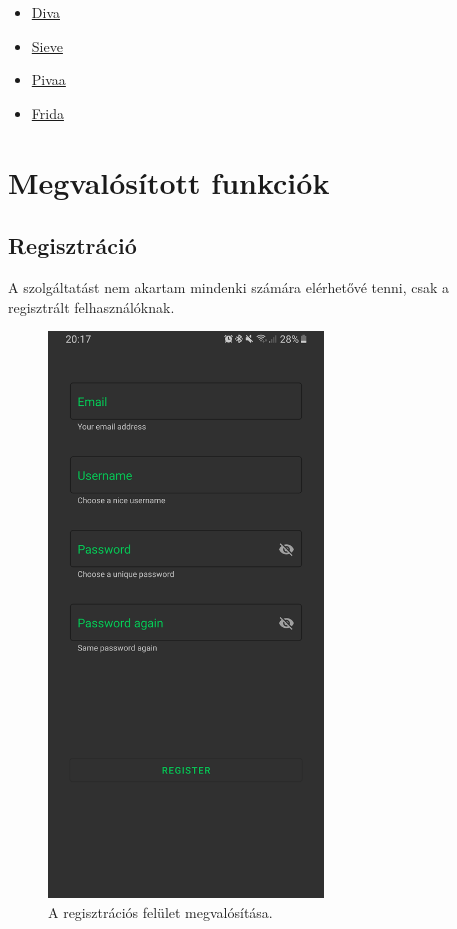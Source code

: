 \documentclass{thesis-ekf}
\theoremstyle{definition}
\theoremstyle{remark}
\begin{document}
\begin{itemize}
	\item \href{https://github.com/payatu/diva-android}{Diva}
	\item \href{https://github.com/as0ler/Android-Examples}{Sieve}
	\item \href{https://github.com/htbridge/pivaa}{Pivaa}
	\item \href{https://github.com/t0thkr1s/frida-demo}{Frida}
\end{itemize}

\chapter{Megvalósított funkciók}\label{funkciok}

\section{Regisztráció}

A szolgáltatást nem akartam mindenki számára elérhetővé tenni, csak a regisztrált felhasználóknak.

\begin{figure}[!h]
	\centering
	\includegraphics[height=15cm]{pictures/registration}
	\caption{A regisztrációs felület megvalósítása.}
	\label{registration}
\end{figure}
\end{document}

